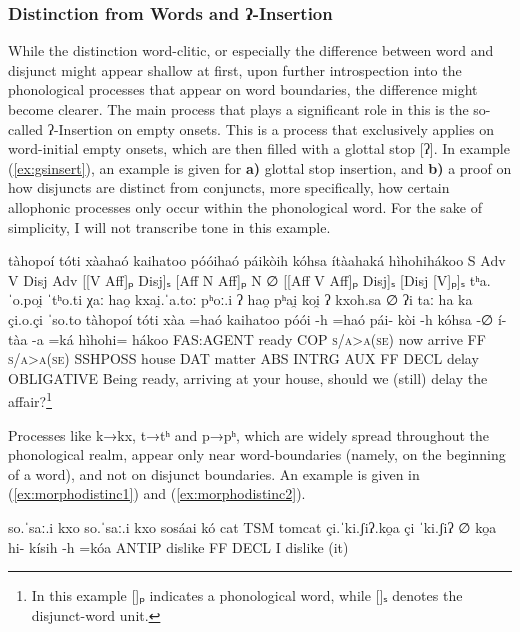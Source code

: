 \documentclass[a4paper, 12pt, oneside]{memoir}
\begin{document}
\subsubsection{Distinction from Words and ʔ-Insertion}\label{smorphonodistinc}
While the distinction word-clitic, or especially the difference between word and disjunct might appear shallow at first, upon further introspection into the phonological processes that appear on word boundaries, the difference might become clearer.
The main process that plays a significant role in this is the so-called ʔ-Insertion on empty onsets. This is a process that exclusively applies on word-initial empty onsets, which are then filled with a glottal stop [ʔ]. In example (\ref{ex:gsinsert}), an example is given for \textbf{a)} glottal stop insertion, and \textbf{b)} a proof on how disjuncts are distinct from conjuncts, more specifically, how certain allophonic processes only occur within the phonological word. For the sake of simplicity, I will not transcribe tone in this example.
\begin{examples}
\newbaarucmd[ans]{=}{\baarujuncture{\texttt{=}}}
    \ex \label{ex:gsinsert}
    \words tàhopoí tóti xàahaó kaihatoo póóihaó páikòih kóhsa ítàahaká hìhohihákoo
    \ans S Adv V Disj Adv [[V Aff]ₚ Disj]ₛ [Aff N Aff]ₚ N ∅ [[Aff V Aff]ₚ Disj]ₛ [Disj [V]ₚ]ₛ 
    \ipa tʰa.ˈo.poi̯ ˈtʰo.ti χaː hao̯ kxai̯.ˈa.toː pʰoː.i ʔ hao̯ pʰai̯ koi̯ ʔ kxoh.sa {∅} ʔi taː ha ka çi.o.çi ˈso.to
    \bits tàhopoí tóti xàa =haó kaihatoo póói -h =haó pái- kòi -h kóhsa -∅ í- tàa -a =ká hìhohi= hákoo
    \gloss FAS:AGENT ready COP \textsc{\textup{s/a>a(se)}} now arrive FF \textsc{\textup{s/a>a(se)}} SSHPOSS house DAT matter ABS INTRG AUX FF DECL delay OBLIGATIVE
    \tr Being ready, arriving at your house, should we (still) delay the affair?\footnote{In this example []ₚ indicates a phonological word, while []ₛ denotes the disjunct-word unit.} 
\end{examples}
Processes like k→kx, t→tʰ and p→pʰ, which are widely spread throughout the phonological realm, appear only near word-boundaries (namely, on the beginning of a word), and not on disjunct boundaries. An example is given in (\ref{ex:morphodistinc1}) and (\ref{ex:morphodistinc2}).
\begin{examples}
    \ex \label{ex:morphodistinc1}
    \script so.ˈsaː.i kxo
    \ipa so.ˈsaː.i kxo
    \bits sosáai kó
    \gloss cat TSM
    \tr tomcat
    \ex \label{ex:morphodistinc2}
    \script çi.ˈki.ʃiʔ.ko̯a
    \ipa çi ˈki.ʃiʔ ∅ ko̯a
    \bits hi- kísih -h =kóa
    \gloss ANTIP dislike FF DECL
    \tr I dislike (it)
\end{examples}
\end{document}
